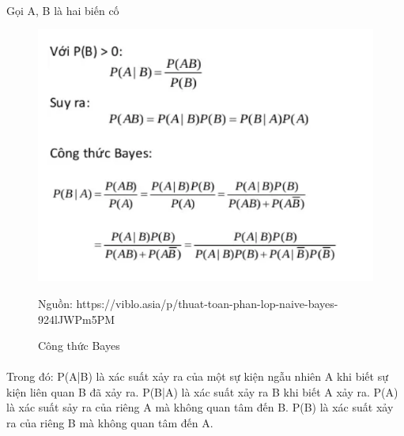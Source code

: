 \documentclass{article}
\begin{document}
\paragraph{}Gọi A, B là hai biến cố
\begin{figure}[!h]
	\begin{center}
		\includegraphics[width=\linewidth]{images/congthucbayes.png}
		\caption{\fontsize{14}{20}\selectfont Công thức Bayes}
		Nguồn: https://viblo.asia/p/thuat-toan-phan-lop-naive-bayes-924lJWPm5PM
	\end{center}
\end{figure}
\paragraph{}Trong đó: P(A|B) là  xác suất xảy ra của một sự kiện ngẫu nhiên A khi biết sự kiện liên quan B đã xảy ra. P(B|A) là xác suất xảy ra B khi biết A xảy ra. P(A) là xác suất sảy ra của riêng A mà không quan tâm đến B. P(B) là xác suất xảy ra của riêng B mà không quan tâm đến A.
\pagebreak{}
\end{document}
